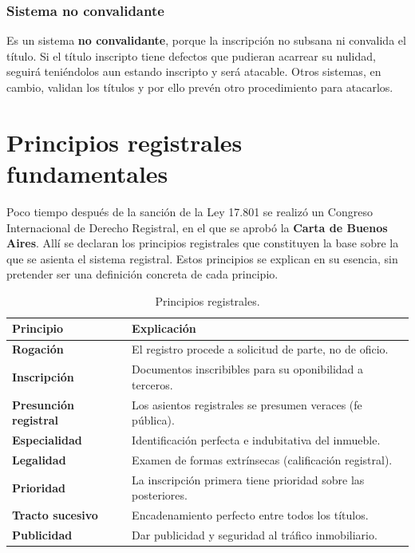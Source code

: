 \documentclass[12pt,oneside]{book}
\begin{document}
\subsection{Sistema no convalidante}

Es un sistema \textbf{no convalidante}, porque la inscripción no subsana ni convalida el título. Si el título inscripto tiene defectos que pudieran acarrear su nulidad, seguirá teniéndolos aun estando inscripto y será atacable. Otros sistemas, en cambio, validan los títulos y por ello prevén otro procedimiento para atacarlos.

\chapter{Principios registrales fundamentales}

Poco tiempo después de la sanción de la Ley 17.801 se realizó un Congreso Internacional de Derecho Registral, en el que se aprobó la \textbf{Carta de Buenos Aires}. Allí se declaran los principios registrales que constituyen la base sobre la que se asienta el sistema registral. Estos principios se explican en su esencia, sin pretender ser una definición concreta de cada principio.

\begin{table}[H]
\centering
\begin{tabularx}{\textwidth}{>{\raggedright\arraybackslash}p{}>{\raggedright\arraybackslash}X}
\toprule
\textbf{Principio} & \textbf{Explicación} \\
\midrule
\textbf{Rogación} & El registro procede a solicitud de parte, no de oficio. \\
\textbf{Inscripción} & Documentos inscribibles para su oponibilidad a terceros. \\
\textbf{Presunción registral} & Los asientos registrales se presumen veraces (fe pública). \\
\textbf{Especialidad} & Identificación perfecta e indubitativa del inmueble. \\
\textbf{Legalidad} & Examen de formas extrínsecas (calificación registral). \\
\textbf{Prioridad} & La inscripción primera tiene prioridad sobre las posteriores. \\
\textbf{Tracto sucesivo} & Encadenamiento perfecto entre todos los títulos. \\
\textbf{Publicidad} & Dar publicidad y seguridad al tráfico inmobiliario. \\
\bottomrule
\end{tabularx}
\caption{Principios registrales.}
\end{table}
\end{document}
